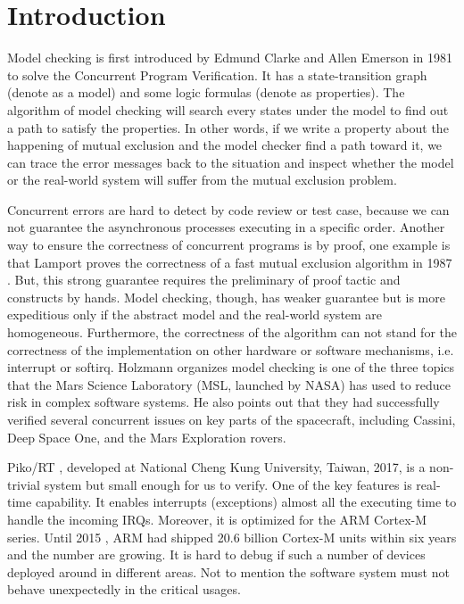 \section{Introduction}
Model checking \cite{Clark:2000, Clarke:2008:BMC:1423535.1423536} is first introduced by Edmund Clarke and Allen Emerson in 1981 to solve the Concurrent Program Verification. It has a state-transition graph (denote as a model) and some logic formulas (denote as properties). The algorithm of model checking will search every states under the model to find out a path to satisfy the properties. In other words, if we write a property about the happening of mutual exclusion and the model checker find a path toward it, we can trace the error messages back to the situation and inspect whether the model or the real-world system will suffer from the mutual exclusion problem.

Concurrent errors are hard to detect by code review or test case, because we can not guarantee the asynchronous processes executing in a specific order. Another way to ensure the correctness of concurrent programs is by proof, one example is that Lamport proves the correctness of a fast mutual exclusion algorithm in 1987 \cite{Lamport:1987:FME:7351.7352}. But, this strong guarantee requires the preliminary of proof tactic and constructs by hands. Model checking, though, has weaker guarantee but is more expeditious only if the abstract model and the real-world system are homogeneous. Furthermore, the correctness of the algorithm can not stand for the correctness of the implementation on other hardware or software mechanisms, i.e. interrupt or softirq. Holzmann \cite{Holzmann:2014:MC:2556647.2560218} organizes model checking is one of the three topics that the Mars Science Laboratory (MSL, launched by NASA) has used to reduce risk in complex software systems. He also points out that they had successfully verified several concurrent issues on key parts of the spacecraft, including Cassini, Deep Space One, and the Mars Exploration rovers.

Piko/RT \cite{PikoRT}, developed at National Cheng Kung University, Taiwan, 2017, is a non-trivial system but small enough for us to verify. One of the key features is real-time capability. It enables interrupts (exceptions) almost all the executing time to handle the incoming IRQs. Moreover, it is optimized for the ARM Cortex-M series. Until 2015 \cite{ARMProduct}, ARM had shipped 20.6 billion Cortex-M units within six years and the number are growing. It is hard to debug if such a number of devices deployed around in different areas. Not to mention the software system must not behave unexpectedly in the critical usages.

